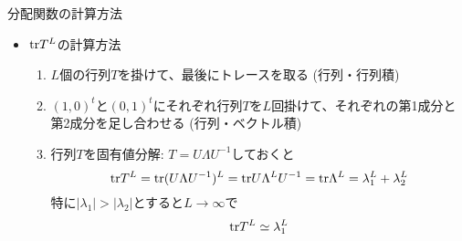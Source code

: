 \begin{frame}[t,fragile]{分配関数の計算方法}
  \begin{itemize}
    \setlength{\itemsep}{1em}
  \item ${\rm tr} T^L$の計算方法
    \begin{enumerate}
    \item $L$個の行列$T$を掛けて、最後にトレースを取る (行列・行列積)
    \item $(1,0)^t$と$(0,1)^t$にそれぞれ行列$T$を$L$回掛けて、それぞれの第1成分と第2成分を足し合わせる (行列・ベクトル積)
    \item 行列$T$を固有値分解: $T = U\Lambda U^{-1}$しておくと
      \[
        {\rm tr} T^L = {\rm tr} (U \Lambda U^{-1})^L = {\rm tr} U \Lambda^L U^{-1} = {\rm tr} \Lambda^L = \lambda_1^L + \lambda_2^L
        \]
        特に$|\lambda_1| > |\lambda_2|$とすると$L\rightarrow\infty$で
        \[
          {\rm tr} T^L \simeq \lambda_1^L
          \]
    \end{enumerate}
  \end{itemize}
\end{frame}
